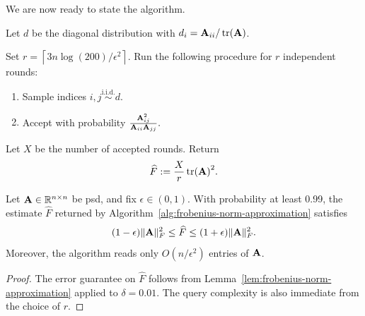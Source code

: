 We are now ready to state the algorithm. 

\begin{algorithm}[H]
\caption{Frobenius Norm Approximation}
\label{alg:frobenius-norm-approximation}

\noindent
Let \(d\) be the diagonal distribution with $d_i = \mathbf{A}_{ii}/\tr(\mathbf{A})$.

\smallskip
Set \(r=\left\lceil 3n\log(200)/\epsilon^2\right\rceil\). Run the following procedure for \(r\) independent rounds:
\begin{enumerate}[
    label=\arabic*.,
    leftmargin=2em,
    itemsep=0.35em,
    topsep=0.45em,
    parsep=0pt
]
    \item Sample indices \(i,j\overset{\mathrm{i.i.d.}}{\sim}d\).

    \item Accept with probability
    \(
        \frac{\mathbf{A}_{ij}^2}{\mathbf{A}_{ii}\mathbf{A}_{jj}}.
    \)
\end{enumerate}

\smallskip
\noindent
Let \(X\) be the number of accepted rounds. Return
\[
    \widehat F:=\frac{X}{r}\tr(\mathbf{A})^2.
\]
\end{algorithm}

\begin{theorem}
\label{thm:frobenius-norm-approximation-algorithm}
Let \(\mathbf{A}\in\mathbb{R}^{n\times n}\) be psd, and fix \(\epsilon\in(0,1)\). With probability at least 0.99, the estimate \(\widehat F\) returned by Algorithm~\ref{alg:frobenius-norm-approximation} satisfies
\[
    (1-\epsilon)\|\mathbf{A}\|_F^2
    \leq
    \widehat F
    \leq
    (1+\epsilon)\|\mathbf{A}\|_F^2.
\]
Moreover, the algorithm reads only \(O(n/\epsilon^2)\) entries of \(\mathbf{A}\).
\end{theorem}

\begin{proof}
The error guarantee on $\widehat F$ follows from Lemma~\ref{lem:frobenius-norm-approximation} applied to $\delta  = 0.01$. The query complexity is also immediate from the choice of $r$.
\end{proof}